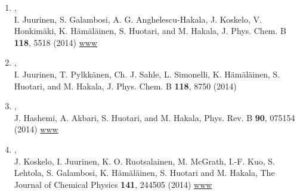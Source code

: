 \documentclass[12pt,a4]{report}
\begin{document}
\begin{enumerate}
\item{},\\
I. Juurinen, S. Galambosi, A. G. Anghelescu-Hakala, J. Koskelo, V. Honkim{\"a}ki, K. H{\"a}m{\"a}l{\"a}inen, S. Huotari, and M. Hakala, J. Phys. Chem. B {\bf 118}, 5518 (2014)
\href{http://pubs.acs.org/doi/full/10.1021/jp501913p}{www}
% 

\item{},\\
I. Juurinen, T. Pylkk{\"a}nen, Ch. J. Sahle, L. Simonelli, K. H{\"a}m{\"a}l{\"a}inen, S. Huotari, and M. Hakala, J. Phys. Chem. B {\bf 118}, 8750 (2014)

\item{},\\ 
J. Hashemi, A. Akbari, S. Huotari, and M. Hakala, Phys. Rev. B {\bf 90}, 075154 (2014) %
\href{http://journals.aps.org/prb/abstract/10.1103/PhysRevB.90.075154}{www}

\item{},\\ 
J. Koskelo, I. Juurinen, K. O. Ruotsalainen, M. McGrath, I.-F. Kuo, S. Lehtola, S. Galambosi, K. H{\"a}m{\"a}l{\"a}inen, S. Huotari and M. Hakala, The Journal of Chemical Physics {\bf 141}, 244505 (2014) 
\href{http://dx.doi.org/10.1063/1.4904278}{www} 



\end{enumerate}
\end{document}
